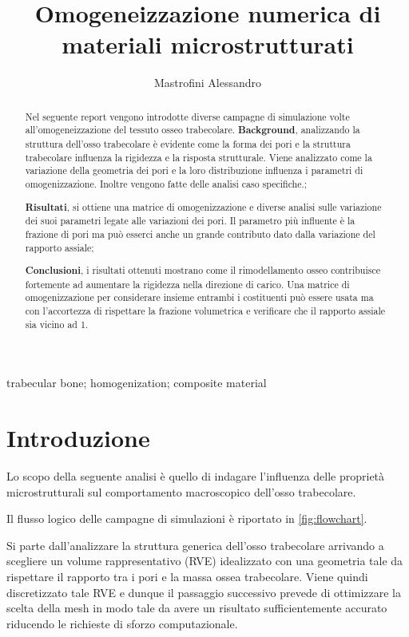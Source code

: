 \documentclass[a4paper,num-refs]{oup-contemporary}
\title{Omogeneizzazione numerica di materiali microstrutturati}
\author{Mastrofini Alessandro}
\begin{document}
\begin{frontmatter}
\maketitle
\begin{abstract}

Nel seguente report vengono introdotte diverse campagne di simulazione volte all'omogeneizzazione del tessuto osseo trabecolare. 
 \textbf{Background}, analizzando la struttura dell'osso trabecolare è evidente come la forma dei pori e la struttura trabecolare influenza la rigidezza e la risposta strutturale. Viene analizzato come la variazione della geometria dei pori e la loro distribuzione influenza i parametri di omogenizzazione. Inoltre vengono fatte delle analisi caso specifiche.;
 
  \textbf{Risultati}, si ottiene una matrice di omogenizzazione e diverse analisi sulle variazione dei suoi parametri legate alle variazioni dei pori. Il parametro più influente è la frazione di pori ma può esserci anche un grande contributo dato dalla variazione del rapporto assiale;
  
   \textbf{Conclusioni}, i risultati ottenuti mostrano come il rimodellamento osseo contribuisce fortemente ad aumentare la rigidezza nella direzione di carico. Una matrice di omogenizzazione per considerare insieme entrambi i costituenti può essere usata ma con l'accortezza di rispettare la frazione volumetrica e verificare che il rapporto assiale sia vicino ad 1. 

\end{abstract}

\begin{keywords}
trabecular bone; homogenization; composite material
\end{keywords}
\end{frontmatter}



\section{Introduzione}

Lo scopo della seguente analisi è quello di indagare l'influenza delle proprietà microstrutturali sul comportamento macroscopico dell'osso trabecolare.

Il flusso logico delle campagne di simulazioni è riportato in \cref{fig:flowchart}. 

Si parte dall'analizzare la struttura generica dell'osso trabecolare arrivando a scegliere un volume rappresentativo (RVE) idealizzato con una geometria tale da rispettare il rapporto tra i pori e la massa ossea trabecolare. Viene quindi discretizzato tale RVE e dunque il passaggio successivo prevede di ottimizzare la scelta della mesh in modo tale da avere un risultato sufficientemente accurato riducendo le richieste di sforzo computazionale. 
\end{document}
